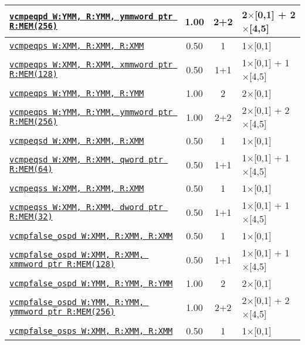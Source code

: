 \documentclass[a4paper,english,fontsize=9]{scrartcl}
\begin{document}
\begin{longtable}{p{}ccL{.25\textwidth}}
  \midrule
  \texttt{\href{https://felixcloutier.com/x86/CMPPD.html}{vcmpeqpd W:YMM, R:YMM, ymmword ptr R:MEM(256)}} & 1.00 & 2+2 & 2\(\times\)[0,1] + 2\(\times\)[4,5] \\
  \midrule
  \texttt{\href{https://felixcloutier.com/x86/CMPPS.html}{vcmpeqps W:XMM, R:XMM, R:XMM}} & 0.50 & 1 & 1\(\times\)[0,1] \\
  \midrule
  \texttt{\href{https://felixcloutier.com/x86/CMPPS.html}{vcmpeqps W:XMM, R:XMM, xmmword ptr R:MEM(128)}} & 0.50 & 1+1 & 1\(\times\)[0,1] + 1\(\times\)[4,5] \\
  \midrule
  \texttt{\href{https://felixcloutier.com/x86/CMPPS.html}{vcmpeqps W:YMM, R:YMM, R:YMM}} & 1.00 & 2 & 2\(\times\)[0,1] \\
  \midrule
  \texttt{\href{https://felixcloutier.com/x86/CMPPS.html}{vcmpeqps W:YMM, R:YMM, ymmword ptr R:MEM(256)}} & 1.00 & 2+2 & 2\(\times\)[0,1] + 2\(\times\)[4,5] \\
  \midrule
  \texttt{\href{https://felixcloutier.com/x86/CMPSD.html}{vcmpeqsd W:XMM, R:XMM, R:XMM}} & 0.50 & 1 & 1\(\times\)[0,1] \\
  \midrule
  \texttt{\href{https://felixcloutier.com/x86/CMPSD.html}{vcmpeqsd W:XMM, R:XMM, qword ptr R:MEM(64)}} & 0.50 & 1+1 & 1\(\times\)[0,1] + 1\(\times\)[4,5] \\
  \midrule
  \texttt{\href{https://felixcloutier.com/x86/CMPSS.html}{vcmpeqss W:XMM, R:XMM, R:XMM}} & 0.50 & 1 & 1\(\times\)[0,1] \\
  \midrule
  \texttt{\href{https://felixcloutier.com/x86/CMPSS.html}{vcmpeqss W:XMM, R:XMM, dword ptr R:MEM(32)}} & 0.50 & 1+1 & 1\(\times\)[0,1] + 1\(\times\)[4,5] \\
  \midrule
  \texttt{\href{https://felixcloutier.com/x86/CMPPD.html}{vcmpfalse\_ospd W:XMM, R:XMM, R:XMM}} & 0.50 & 1 & 1\(\times\)[0,1] \\
  \midrule
  \texttt{\href{https://felixcloutier.com/x86/CMPPD.html}{vcmpfalse\_ospd W:XMM, R:XMM, xmmword ptr R:MEM(128)}} & 0.50 & 1+1 & 1\(\times\)[0,1] + 1\(\times\)[4,5] \\
  \midrule
  \texttt{\href{https://felixcloutier.com/x86/CMPPD.html}{vcmpfalse\_ospd W:YMM, R:YMM, R:YMM}} & 1.00 & 2 & 2\(\times\)[0,1] \\
  \midrule
  \texttt{\href{https://felixcloutier.com/x86/CMPPD.html}{vcmpfalse\_ospd W:YMM, R:YMM, ymmword ptr R:MEM(256)}} & 1.00 & 2+2 & 2\(\times\)[0,1] + 2\(\times\)[4,5] \\
  \midrule
  \texttt{\href{https://felixcloutier.com/x86/CMPPS.html}{vcmpfalse\_osps W:XMM, R:XMM, R:XMM}} & 0.50 & 1 & 1\(\times\)[0,1] \\

\end{longtable}
\end{document}
